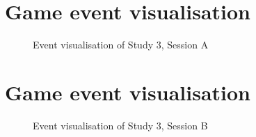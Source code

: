 \section{Game event visualisation}
\begin{figure}[H]
  \centering
  \caption{Event visualisation of Study 3, Session A}
\end{figure}

\section{Game event visualisation}
\begin{figure}[H]
  \centering
  \caption{Event visualisation of Study 3, Session B}
\end{figure}
